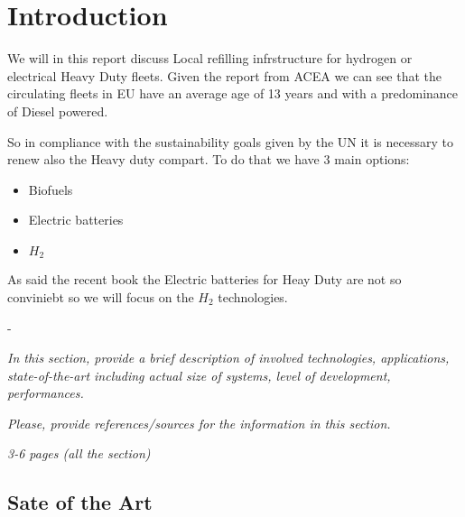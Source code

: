\newpage
\chapter{Introduction}
We will in this report discuss Local refilling infrstructure for hydrogen or electrical Heavy Duty fleets.
Given the report from ACEA \cite{ACEA2021} we can see that the circulating fleets in EU have an average age of 13 years and with a predominance of Diesel powered.

So in compliance with the sustainability goals given by the UN it is necessary to renew also the Heavy duty compart. To do that we have 3 main options:
\begin{itemize}
    \item Biofuels
    \item Electric batteries
    \item $H_2$
\end{itemize}
As said the recent book \cite{Mazzo2021} the Electric batteries for Heay Duty are not so conviniebt so we will focus on the $H_2$ technologies.

-

\textit{In this section, provide a brief description of involved technologies, applications, state-of-the-art including actual size of systems, level of development, performances.}

\textit{Please, provide references/sources for the information in this section.}

\textit{3-6 pages (all the section)}

\section{Sate of the Art}